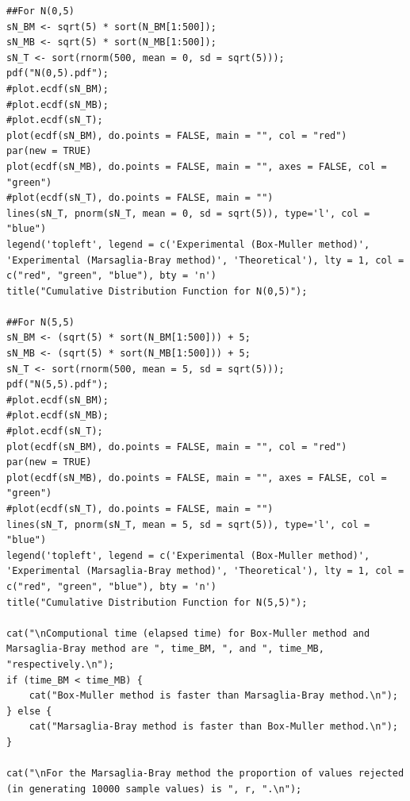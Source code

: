 \documentclass[11pt]{article}
\begin{document}
\begin{lstlisting}
##For N(0,5)
sN_BM <- sqrt(5) * sort(N_BM[1:500]);
sN_MB <- sqrt(5) * sort(N_MB[1:500]);
sN_T <- sort(rnorm(500, mean = 0, sd = sqrt(5)));
pdf("N(0,5).pdf");
#plot.ecdf(sN_BM);
#plot.ecdf(sN_MB);
#plot.ecdf(sN_T);
plot(ecdf(sN_BM), do.points = FALSE, main = "", col = "red")
par(new = TRUE)
plot(ecdf(sN_MB), do.points = FALSE, main = "", axes = FALSE, col = "green")
#plot(ecdf(sN_T), do.points = FALSE, main = "")
lines(sN_T, pnorm(sN_T, mean = 0, sd = sqrt(5)), type='l', col = "blue")
legend('topleft', legend = c('Experimental (Box-Muller method)', 'Experimental (Marsaglia-Bray method)', 'Theoretical'), lty = 1, col = c("red", "green", "blue"), bty = 'n')
title("Cumulative Distribution Function for N(0,5)");

##For N(5,5)
sN_BM <- (sqrt(5) * sort(N_BM[1:500])) + 5;
sN_MB <- (sqrt(5) * sort(N_MB[1:500])) + 5;
sN_T <- sort(rnorm(500, mean = 5, sd = sqrt(5)));
pdf("N(5,5).pdf");
#plot.ecdf(sN_BM);
#plot.ecdf(sN_MB);
#plot.ecdf(sN_T);
plot(ecdf(sN_BM), do.points = FALSE, main = "", col = "red")
par(new = TRUE)
plot(ecdf(sN_MB), do.points = FALSE, main = "", axes = FALSE, col = "green")
#plot(ecdf(sN_T), do.points = FALSE, main = "")
lines(sN_T, pnorm(sN_T, mean = 5, sd = sqrt(5)), type='l', col = "blue")
legend('topleft', legend = c('Experimental (Box-Muller method)', 'Experimental (Marsaglia-Bray method)', 'Theoretical'), lty = 1, col = c("red", "green", "blue"), bty = 'n')
title("Cumulative Distribution Function for N(5,5)");

cat("\nComputional time (elapsed time) for Box-Muller method and Marsaglia-Bray method are ", time_BM, ", and ", time_MB, "respectively.\n");
if (time_BM < time_MB) {
	cat("Box-Muller method is faster than Marsaglia-Bray method.\n");
} else {
	cat("Marsaglia-Bray method is faster than Box-Muller method.\n");
}

cat("\nFor the Marsaglia-Bray method the proportion of values rejected (in generating 10000 sample values) is ", r, ".\n");
\end{lstlisting}
\end{document}
